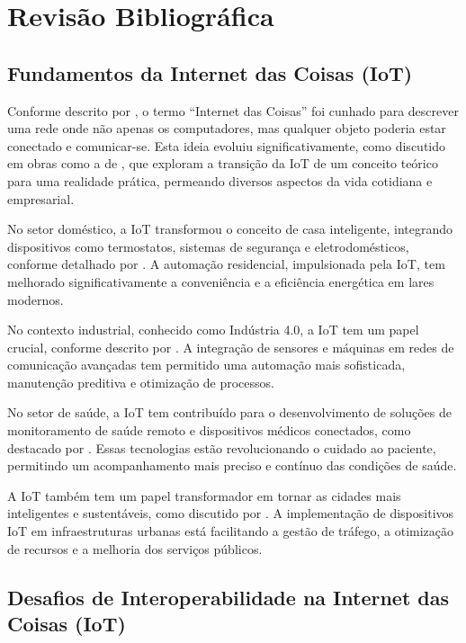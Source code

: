 \chapter{Revisão Bibliográfica}

\section{Fundamentos da Internet das Coisas (IoT)}

Conforme descrito por \cite{Ashton2009}, o termo ``Internet das Coisas'' foi cunhado para descrever uma rede onde não apenas os computadores, mas qualquer objeto poderia estar conectado e comunicar-se. Esta ideia evoluiu significativamente, como discutido em obras como a de \cite{Gubbi2013}, que exploram a transição da IoT de um conceito teórico para uma realidade prática, permeando diversos aspectos da vida cotidiana e empresarial.

No setor doméstico, a IoT transformou o conceito de casa inteligente, integrando dispositivos como termostatos, sistemas de segurança e eletrodomésticos, conforme detalhado por \cite{Swan2012}. A automação residencial, impulsionada pela IoT, tem melhorado significativamente a conveniência e a eficiência energética em lares modernos.

No contexto industrial, conhecido como Indústria 4.0, a IoT tem um papel crucial, conforme descrito por \cite{Lu2017}. A integração de sensores e máquinas em redes de comunicação avançadas tem permitido uma automação mais sofisticada, manutenção preditiva e otimização de processos.

No setor de saúde, a IoT tem contribuído para o desenvolvimento de soluções de monitoramento de saúde remoto e dispositivos médicos conectados, como destacado por \cite{Islam2015}. Essas tecnologias estão revolucionando o cuidado ao paciente, permitindo um acompanhamento mais preciso e contínuo das condições de saúde.

A IoT também tem um papel transformador em tornar as cidades mais inteligentes e sustentáveis, como discutido por \cite{Zanella2014}. A implementação de dispositivos IoT em infraestruturas urbanas está facilitando a gestão de tráfego, a otimização de recursos e a melhoria dos serviços públicos.

\section{Desafios de Interoperabilidade na Internet das Coisas (IoT)}

